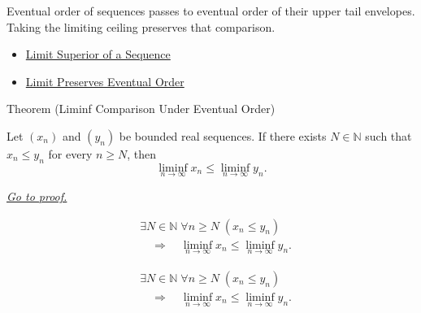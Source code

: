 \begin{remark*}[Interpretation]
Eventual order of sequences passes to eventual order of their upper tail
envelopes. Taking the limiting ceiling preserves that comparison.
\end{remark*}

\begin{dependencies}
\begin{itemize}
  \item \hyperref[def:limsup-sequence]{Limit Superior of a Sequence}
  \item \hyperref[thm:limit-preserves-eventual-order]{Limit Preserves Eventual Order}
\end{itemize}
\end{dependencies}


\begin{theorembox}{Theorem (Liminf Comparison Under Eventual Order)}
\begin{theorem}
\label{thm:liminf-comparison-under-eventual-order}
Let $(x_n)$ and $(y_n)$ be bounded real sequences. If there exists
$N\in\mathbb{N}$ such that $x_n\le y_n$ for every $n\ge N$, then
\[
  \liminf_{n\to\infty}x_n
  \le
  \liminf_{n\to\infty}y_n.
\]

\smallskip
\noindent
\hyperref[prf:liminf-comparison-under-eventual-order]{\textit{Go to proof.}}
\end{theorem}
\end{theorembox}

\begin{remark*}
\[
\begin{aligned}
&\exists N\in\mathbb{N}\;\forall n\ge N\;(x_n\le y_n)\\
&\quad\Longrightarrow\quad
\liminf_{n\to\infty}x_n
\le
\liminf_{n\to\infty}y_n.
\end{aligned}
\]
\end{remark*}

\begin{remark*}
\[
\begin{aligned}
&\exists N\in\mathbb{N}\;\forall n\ge N\;(x_n\le y_n)\\
&\quad\Longrightarrow\quad
\liminf_{n\to\infty}x_n
\le
\liminf_{n\to\infty}y_n.
\end{aligned}
\]
\end{remark*}

